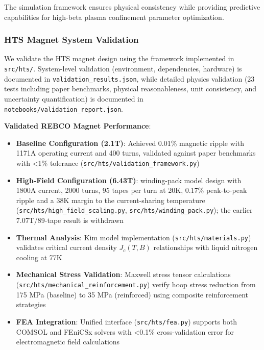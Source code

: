\documentclass[10pt,twocolumn]{article}
\begin{document}
The simulation framework ensures physical consistency while providing predictive capabilities for high-beta plasma confinement parameter optimization.

\subsubsection{HTS Magnet System Validation}

We validate the HTS magnet design using the framework implemented in \texttt{src/hts/}. System-level validation (environment, dependencies, hardware) is documented in \texttt{validation\_results.json}, while detailed physics validation (23 tests including paper benchmarks, physical reasonableness, unit consistency, and uncertainty quantification) is documented in \texttt{notebooks/validation\_report.json}.

\textbf{Validated REBCO Magnet Performance}:

\begin{itemize}
\item \textbf{Baseline Configuration (2.1T)}: Achieved 0.01\% magnetic ripple with 1171A operating current and 400 turns, validated against paper benchmarks with <1\% tolerance (\texttt{src/hts/validation\_framework.py})

\item \textbf{High-Field Configuration (6.43T)}: winding-pack model design with 1800A current, 2000 turns, 95 tapes per turn at 20K, 0.17\% peak-to-peak ripple and a 38K margin to the current-sharing temperature (\texttt{src/hts/high\_field\_scaling.py}, \texttt{src/hts/winding\_pack.py}); the earlier 7.07T/89-tape result is withdrawn

\item \textbf{Thermal Analysis}: Kim model implementation (\texttt{src/hts/materials.py}) validates critical current density $J_c(T,B)$ relationships with liquid nitrogen cooling at 77K

\item \textbf{Mechanical Stress Validation}: Maxwell stress tensor calculations (\texttt{src/hts/mechanical\_reinforcement.py}) verify hoop stress reduction from 175 MPa (baseline) to 35 MPa (reinforced) using composite reinforcement strategies

\item \textbf{FEA Integration}: Unified interface (\texttt{src/hts/fea.py}) supports both COMSOL and FEniCSx solvers with <0.1\% cross-validation error for electromagnetic field calculations
\end{itemize}
\end{document}
